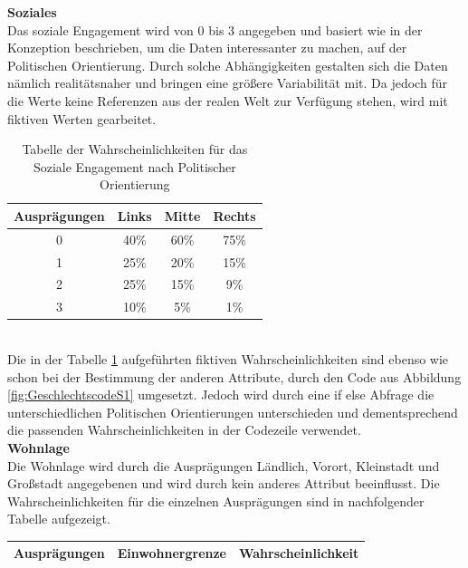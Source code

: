\begin{onehalfspace}
\textbf{Soziales}\\
Das soziale Engagement wird von 0 bis 3 angegeben und basiert wie in der Konzeption beschrieben, um die Daten interessanter zu machen, auf der Politischen Orientierung. Durch solche Abhängigkeiten gestalten sich die Daten nämlich realitätsnaher und bringen eine größere Variabilität mit. Da jedoch für die Werte keine Referenzen aus der realen Welt zur Verfügung stehen, wird mit fiktiven Werten gearbeitet.\\
\begin{table}[!h]
    \centering
    \begin{tabular}{|c|c|c|c|}
    \hline
    \textbf{Ausprägungen} & \textbf{Links} & \textbf{Mitte} & \textbf{Rechts} \\ \hline
    0                     & 40\%           & 60\%           & 75\%            \\ \hline
    1                     & 25\%           & 20\%           & 15\%            \\ \hline
    2                     & 25\%           & 15\%           & 9\%             \\ \hline
    3                     & 10\%           & 5\%            & 1\%             \\ \hline
    \end{tabular}
    \caption{Tabelle der Wahrscheinlichkeiten für das Soziale Engagement nach Politischer Orientierung}
    \label{table:9}
\end{table}\\
Die in der Tabelle \ref{table:9} aufgeführten fiktiven Wahrscheinlichkeiten sind ebenso wie schon bei der Bestimmung der anderen Attribute, durch den Code aus Abbildung \ref{fig:GeschlechtscodeS1} umgesetzt. Jedoch wird durch eine if else Abfrage die unterschiedlichen Politischen Orientierungen unterschieden und dementsprechend die passenden Wahrscheinlichkeiten in der Codezeile verwendet.\\
\textbf{Wohnlage}\\
Die Wohnlage wird durch die Ausprägungen Ländlich, Vorort, Kleinstadt und Großstadt angegebenen und wird durch kein anderes Attribut beeinflusst. Die Wahrscheinlichkeiten für die einzelnen Ausprägungen sind in nachfolgender Tabelle aufgezeigt.
\begin{table}[!h]
    \centering
    \begin{tabular}{|c|c|c|}
    \hline
    \textbf{Ausprägungen} & \textbf{Einwohnergrenze} & \textbf{Wahrscheinlichkeit} \\ \hline

\end{tabular}
\end{table}
\end{onehalfspace}
